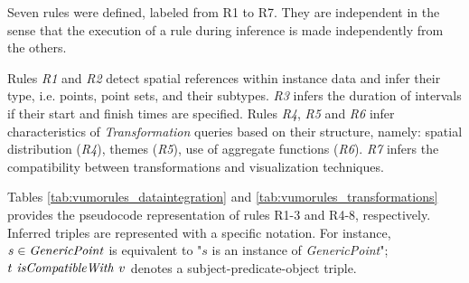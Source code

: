 \documentclass[]{interact}
\theoremstyle{plain}%
\theoremstyle{definition}
\theoremstyle{remark}
\theoremstyle{definition}
\begin{document}

Seven rules were defined, labeled from R1 to R7. They are independent in the sense that the execution of a rule during inference is made independently from the others.

Rules \textit{R1} and \textit{R2} detect spatial references within instance data and infer their type, i.e. points, point sets, and their subtypes. \textit{R3} infers the duration of intervals if their start and finish times are specified. Rules \textit{R4}, \textit{R5} and \textit{R6} infer characteristics of \textit{Transformation} queries based on their structure, namely: spatial distribution (\textit{R4}), themes (\textit{R5}), use of aggregate functions (\textit{R6}). \textit{R7} infers the compatibility between transformations and visualization techniques.


Tables \ref{tab:vumorules_dataintegration} and \ref{tab:vumorules_transformations} provides the pseudocode representation of rules R1-3 and R4-8, respectively. Inferred triples are represented with a specific notation. For instance, $s \in \mbox{\textit{GenericPoint}}$ is equivalent to "$s$ is an instance of \textit{GenericPoint}"; $t \mbox{\textit{ isCompatibleWith }} v$ denotes a subject-predicate-object triple.

\end{document}

